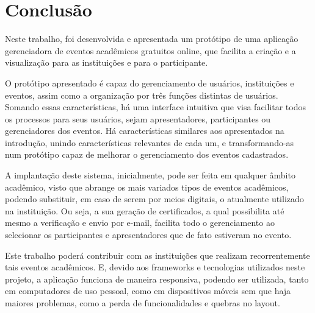 \chapter{Conclusão}\label{chp:LABEL_CHP_6}

Neste trabalho, foi desenvolvida e apresentada um protótipo de uma aplicação gerenciadora de eventos acadêmicos gratuitos online, que facilita a criação e a visualização para as instituições e para o participante.

O protótipo apresentado é capaz do gerenciamento de usuários, instituições e eventos, assim como a organização por três funções distintas de usuários. Somando essas características, há uma interface intuitiva que visa facilitar todos os processos para seus usuários, sejam apresentadores, participantes ou gerenciadores dos eventos. Há características similares aos apresentados na introdução, unindo características relevantes de cada um, e transformando-as num protótipo capaz de melhorar o gerenciamento dos eventos cadastrados.

A implantação deste sistema, inicialmente, pode ser feita em qualquer âmbito acadêmico, visto que abrange os mais variados tipos de eventos acadêmicos, podendo substituir, em caso de serem por meios digitais, o atualmente utilizado na instituição. Ou seja, a sua geração de certificados, a qual possibilita até mesmo a verificação e envio por e-mail, facilita todo o gerenciamento ao selecionar os participantes e apresentadores que de fato estiveram no evento.


Este trabalho poderá contribuir com as instituições que realizam recorrentemente tais eventos acadêmicos.  E, devido aos frameworks e tecnologias utilizados neste projeto, a aplicação funciona de maneira responsiva, podendo ser utilizada, tanto em computadores de uso pessoal, como em dispositivos móveis sem que haja maiores problemas, como a perda de funcionalidades e quebras no layout.


